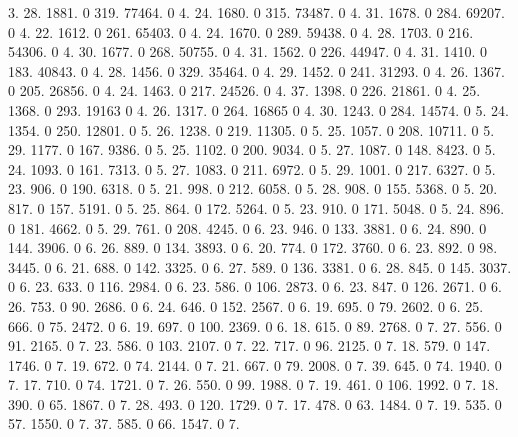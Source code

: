 3. 28. 1881. 0 319. 77464. 0 4. 24. 1680. 0 315. 73487. 0 4. 31. 1678. 0 284. 69207. 0 4. 22. 1612. 0 261. 65403. 0 4. 24. 1670. 0 289. 59438. 0 4. 28. 1703. 0 216. 54306. 0 4. 30. 1677. 0 268. 50755. 0 4. 31. 1562. 0 226. 44947. 0 4. 31. 1410. 0 183. 40843. 0 4. 28. 1456. 0 329. 35464. 0 4. 29. 1452. 0 241. 31293. 0 4. 26. 1367. 0 205. 26856. 0 4. 24. 1463. 0 217. 24526. 0 4. 37. 1398. 0 226. 21861. 0 4. 25. 1368. 0 293. 19163 0 4. 26. 1317. 0 264. 16865 0 4. 30. 1243. 0 284. 14574. 0 5. 24. 1354. 0 250. 12801. 0 5. 26. 1238. 0 219. 11305. 0 5. 25. 1057. 0 208. 10711. 0 5. 29. 1177. 0 167. 9386. 0 5. 25. 1102. 0 200. 9034. 0 5. 27. 1087. 0 148. 8423. 0 5. 24. 1093. 0 161. 7313. 0 5. 27. 1083. 0 211. 6972. 0 5. 29. 1001. 0 217. 6327. 0 5. 23. 906. 0 190. 6318. 0 5. 21. 998. 0 212. 6058. 0 5. 28. 908. 0 155. 5368. 0 5. 20. 817. 0 157. 5191. 0 5. 25. 864. 0 172. 5264. 0 5. 23. 910. 0 171. 5048. 0 5. 24. 896. 0 181. 4662. 0 5. 29. 761. 0 208. 4245. 0 6. 23. 946. 0 133. 3881. 0 6. 24. 890. 0 144. 3906. 0 6. 26. 889. 0 134. 3893. 0 6. 20. 774. 0 172. 3760. 0 6. 23. 892. 0 98. 3445. 0 6. 21. 688. 0 142. 3325. 0 6. 27. 589. 0 136. 3381. 0 6. 28. 845. 0 145. 3037. 0 6. 23. 633. 0 116. 2984. 0 6. 23. 586. 0 106. 2873. 0 6. 23. 847. 0 126. 2671. 0 6. 26. 753. 0 90. 2686. 0 6. 24. 646. 0 152. 2567. 0 6. 19. 695. 0 79. 2602. 0 6. 25. 666. 0 75. 2472. 0 6. 19. 697. 0 100. 2369. 0 6. 18. 615. 0 89. 2768. 0 7. 27. 556. 0 91. 2165. 0 7. 23. 586. 0 103. 2107. 0 7. 22. 717. 0 96. 2125. 0 7. 18. 579. 0 147. 1746. 0 7. 19. 672. 0 74. 2144. 0 7. 21. 667. 0 79. 2008. 0 7. 39. 645. 0 74. 1940. 0 7. 17. 710. 0 74. 1721. 0 7. 26. 550. 0 99. 1988. 0 7. 19. 461. 0 106. 1992. 0 7. 18. 390. 0 65. 1867. 0 7. 28. 493. 0 120. 1729. 0 7. 17. 478. 0 63. 1484. 0 7. 19. 535. 0 57. 1550. 0 7. 37. 585. 0 66. 1547. 0 7. 
